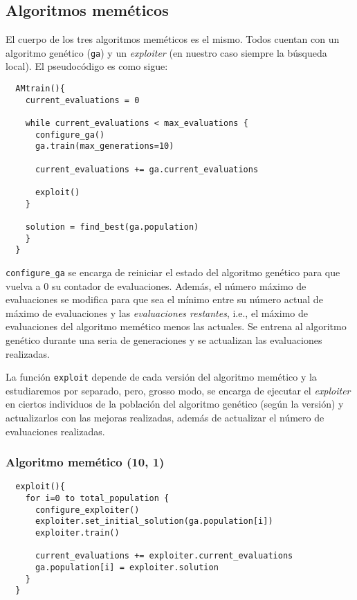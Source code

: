 \documentclass[11pt]{article}
\theoremstyle{plain}
\theoremstyle{definition}
\begin{document}
\subsection{Algoritmos meméticos}

El cuerpo de los tres algoritmos meméticos es el mismo. Todos cuentan con un algoritmo genético (\texttt{ga}) y un \textit{exploiter} (en nuestro caso siempre la búsqueda local). El pseudocódigo es como sigue: \\

\begin{lstlisting}
  AMtrain(){
    current_evaluations = 0

    while current_evaluations < max_evaluations {
      configure_ga()
      ga.train(max_generations=10)

      current_evaluations += ga.current_evaluations

      exploit()
    }

    solution = find_best(ga.population)
    }
  }
\end{lstlisting}

\texttt{configure\_ga} se encarga de reiniciar el estado del algoritmo genético para que vuelva a 0 su contador de evaluaciones. Además, el número máximo de evaluaciones se modifica para que sea el mínimo entre su número actual de máximo de evaluaciones y las \textit{evaluaciones restantes}, i.e., el máximo de evaluaciones del algoritmo memético menos las actuales. Se entrena al algoritmo genético durante una seria de generaciones y se actualizan las evaluaciones realizadas.

La función \texttt{exploit} depende de cada versión del algoritmo memético y la estudiaremos por separado, pero, grosso modo, se encarga de ejecutar el \textit{exploiter} en ciertos individuos de la población del algoritmo genético (según la versión) y actualizarlos con las mejoras realizadas, además de actualizar el número de evaluaciones realizadas. \\

\subsubsection{Algoritmo memético (10, 1)}

\begin{lstlisting}
  exploit(){
    for i=0 to total_population {
      configure_exploiter()
      exploiter.set_initial_solution(ga.population[i])
      exploiter.train()

      current_evaluations += exploiter.current_evaluations
      ga.population[i] = exploiter.solution
    }
  }
\end{lstlisting}
\end{document}
